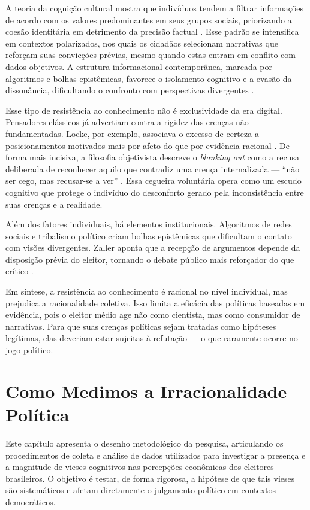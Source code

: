 A teoria da cognição cultural mostra que indivíduos tendem a filtrar informações de acordo com os valores predominantes em seus grupos sociais, priorizando a coesão identitária em detrimento da precisão factual \cite{kahan2012polarization}. Esse padrão se intensifica em contextos polarizados, nos quais os cidadãos selecionam narrativas que reforçam suas convicções prévias, mesmo quando estas entram em conflito com dados objetivos. A estrutura informacional contemporânea, marcada por algoritmos e bolhas epistêmicas, favorece o isolamento cognitivo e a evasão da dissonância, dificultando o confronto com perspectivas divergentes \cite{sunstein2017republic}.

Esse tipo de resistência ao conhecimento não é exclusividade da era digital. Pensadores clássicos já advertiam contra a rigidez das crenças não fundamentadas. Locke, por exemplo, associava o excesso de certeza a posicionamentos motivados mais por afeto do que por evidência racional \cite{locke2014ensaio}. De forma mais incisiva, a filosofia objetivista descreve o \textit{blanking out} como a recusa deliberada de reconhecer aquilo que contradiz uma crença internalizada — “não ser cego, mas recusar-se a ver” \cite[p.~869]{rand2012revolta}. Essa cegueira voluntária opera como um escudo cognitivo que protege o indivíduo do desconforto gerado pela inconsistência entre suas crenças e a realidade.

Além dos fatores individuais, há elementos institucionais. Algoritmos de redes sociais e tribalismo político criam bolhas epistêmicas que dificultam o contato com visões divergentes. Zaller aponta que a recepção de argumentos depende da disposição prévia do eleitor, tornando o debate público mais reforçador do que crítico \cite{zaller1992nature}.

Em síntese, a resistência ao conhecimento é racional no nível individual, mas prejudica a racionalidade coletiva. Isso limita a eficácia das políticas baseadas em evidência, pois o eleitor médio age não como cientista, mas como consumidor de narrativas. Para que suas crenças políticas sejam tratadas como hipóteses legítimas, elas deveriam estar sujeitas à refutação — o que raramente ocorre no jogo político.

\chapter{Como Medimos a Irracionalidade Política}

Este capítulo apresenta o desenho metodológico da pesquisa, articulando os procedimentos de coleta e análise de dados utilizados para investigar a presença e a magnitude de vieses cognitivos nas percepções econômicas dos eleitores brasileiros. O objetivo é testar, de forma rigorosa, a hipótese de que tais vieses são sistemáticos e afetam diretamente o julgamento político em contextos democráticos.

